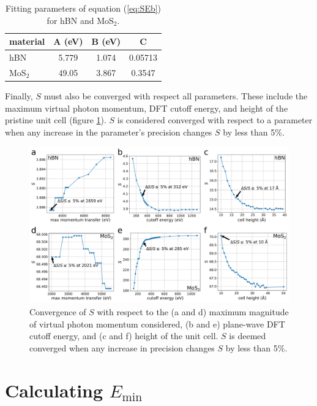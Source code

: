 \documentclass{article}
\begin{document}
\begin{table} \centering 
  \begin{tabular}{lccc}
    \toprule
    material &A (eV) &B (eV) &C \\
    \midrule
    hBN     &5.779 &1.074 &0.05713 \\
    MoS$_2$ &49.05 &3.867 &0.3547 \\
    \bottomrule
  \end{tabular}
  \caption{
    Fitting parameters of equation (\ref{eq:SEb}) for hBN and MoS$_2$.
  } 
\label{tab:fit}
\end{table}

Finally, $S$ must also be converged with respect all parameters.  These include
the maximum virtual photon momentum, DFT cutoff energy, and height of the
pristine unit cell (figure \ref{fig:convergences}).
$S$ is considered converged with respect to a parameter when any increase in
the parameter's precision changes $S$ by less than 5\%.

\begin{figure}[H]
  \centering
  \includegraphics[width=\textwidth]{images/convergences.pdf}
  \caption{
    Convergence of $S$ with respect to the (a and d) maximum magnitude of
    virtual photon momentum considered, (b and e) plane-wave DFT cutoff energy,
    and (c and f) height of the unit cell.
    $S$ is deemed converged when any increase in precision changes $S$ by less
    than 5\%.
  }
  \label{fig:convergences}
\end{figure}
\break

\pagebreak
\section{Calculating $E_\text{min}$}
\label{app:Emin}
\end{document}

